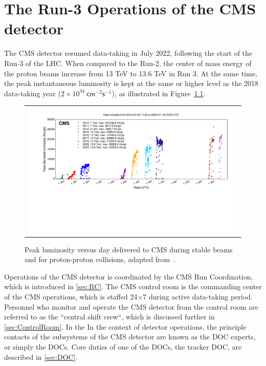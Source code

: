 \chapter{The Run-3 Operations of the CMS detector}
\label{chap:Ops}

The \ac{CMS} detector resumed data-taking in July 2022, following the start of the Run-3 of the \ac{LHC}. When compared to the Run-2, the center of mass energy of the proton beams increase from 13 TeV to 13.6 TeV in Run 3. At the same time, the peak instantaneous luminosity is kept at the same or higher level as the 2018 data-taking year ($2\times10^{34}~\textsf{cm}^{-2}\textsf{s}^{-1}$), as illustrated in Figure~\ref{fig:peak}.

\begin{figure}[tbh!]
 \begin{center}
 \begin{tabular}{c}
 \includegraphics[width=\textwidth]{figures/Part2/Operation/peak_lumi_pp}
 \end{tabular}
 \caption{Peak luminosity versus day delivered to \ac{CMS} during stable beams and for proton-proton collisions, adapted from~\cite{twiki:lumi}.}
 \label{fig:peak}
 \end{center}
\end{figure}

Operations of the \ac{CMS} detector is coordinated by the \ac{CMS} Run Coordination, which is introduced in \autoref{sec:RC}. The \ac{CMS} control room is the commanding center of the \ac{CMS} operations, which is staffed 24$\times$7 during active data-taking period. Personnel who monitor and operate the \ac{CMS} detector from the control room are referred to as the ``central shift crew``, which is discussed further in \autoref{sec:ControlRoom}. In the In the context of detector operations, the principle contacts of the subsystems of the \ac{CMS} detector are known as the \ac{DOC} experts, or simply the \acp{DOC}. Core duties of one of the \acp{DOC}, the tracker \ac{DOC}, are described in \autoref{sec:DOC}.

